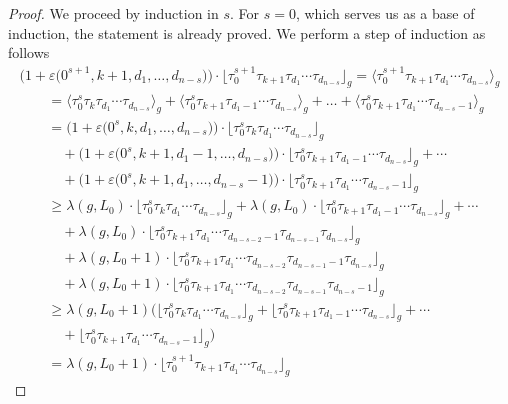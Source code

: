 \documentclass[pdftex]{sigma}
\renewcommand{\epsilon}{\varepsilon}
\theoremstyle{definition}
\begin{document}
\begin{proof}
We proceed by induction in $s$. For $s=0$, which serves us as a base of induction, the statement is already proved. We
perform a step of induction as follows
\begin{gather*}
\big(1+\epsilon\big(0^{s+1},k+1,d_1,\dots,d_{n-s}\big)\big)
\cdot\big\lfloor\tau_0^{s+1}\tau_{k+1}\tau_{d_1}\cdots\tau_{d_{n-s}}\big\rfloor_g
 =\big\langle\tau_0^{s+1}\tau_{k+1}\tau_{d_1}\cdots\tau_{d_{n-s}}\big\rangle_g
\\
\qquad{} =\big\langle\tau_0^s\tau_k\tau_{d_1}\cdots\tau_{d_{n-s}}\big\rangle_g
+\big\langle\tau_0^s\tau_{k+1}\tau_{d_1-1}\cdots\tau_{d_{n-s}}\big\rangle_g
+\dots
+\big\langle\tau_0^s\tau_{k+1}\tau_{d_1}\cdots\tau_{d_{n-s}-1}\big\rangle_g
\\
\qquad{} =\big(1+\epsilon\big(0^s,k,d_1,\dots,d_{n-s}\big)\big)
\cdot\big\lfloor\tau_0^s\tau_k\tau_{d_1}\cdots\tau_{d_{n-s}}\big\rfloor_g
\\
\qquad\quad{}+\big(1+\epsilon\big(0^s,k+1,d_1-1,\dots,d_{n-s}\big)\big)
\cdot\big\lfloor\tau_0^s\tau_{k+1}\tau_{d_1-1}\cdots\tau_{d_{n-s}}\big\rfloor_g
+\cdots
\\
\qquad\quad{} +\big(1+\epsilon\big(0^s,k+1,d_1,\dots,d_{n-s}-1\big)\big)
\cdot\big\lfloor\tau_0^s\tau_{k+1}\tau_{d_1}\cdots\tau_{d_{n-s}-1}\big\rfloor_g
\\
\qquad{} \ge\lambda(g,L_0)
\cdot\big\lfloor\tau_0^s\tau_k\tau_{d_1}\cdots\tau_{d_{n-s}}\big\rfloor_g
+\lambda(g,L_0)
\cdot\big\lfloor\tau_0^s\tau_{k+1}\tau_{d_1-1}\cdots\tau_{d_{n-s}}\big\rfloor_g+\cdots
\\
\qquad\quad{} +\lambda(g,L_0)
\cdot\big\lfloor\tau_0^s\tau_{k+1}\tau_{d_1}\cdots\tau_{d_{n-s-2}-1}\tau_{d_{n-s-1}}\tau_{d_{n-s}}\big\rfloor_g\\
\qquad\quad{} +\lambda(g,L_0+1)
\cdot\big\lfloor\tau_0^s\tau_{k+1}\tau_{d_1}\cdots\tau_{d_{n-s-2}}\tau_{d_{n-s-1}-1}\tau_{d_{n-s}}\big\rfloor_g
\\
\qquad\quad{}
+\lambda(g,L_0+1)
\cdot\big\lfloor\tau_0^s\tau_{k+1}\tau_{d_1}\cdots\tau_{d_{n-s-2}}\tau_{d_{n-s-1}}\tau_{d_{n-s}-1}\big\rfloor_g
\\
\qquad{} \ge\lambda(g,L_0+1)\big(
\big\lfloor\tau_0^s\tau_k\tau_{d_1}\cdots\tau_{d_{n-s}}\big\rfloor_g
+\big\lfloor\tau_0^s\tau_{k+1}\tau_{d_1-1}\cdots\tau_{d_{n-s}}\big\rfloor_g
+\cdots\\
\qquad\quad{}
+\big\lfloor\tau_0^s\tau_{k+1}\tau_{d_1}\cdots\tau_{d_{n-s}-1}\big\rfloor_g
\big)\\
\qquad{} =
\lambda(g,L_0+1)
\cdot\big\lfloor\tau_0^{s+1}\tau_{k+1}\tau_{d_1}\cdots\tau_{d_{n-s}}\big\rfloor_g

\end{gather*}
\end{proof}
\end{document}
